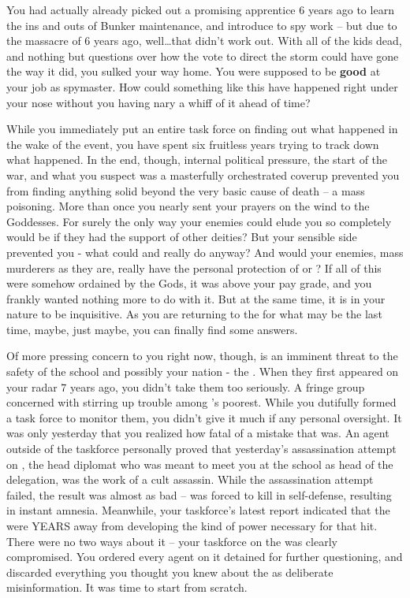 \documentclass[char]{GL2020}
\begin{document}
You had actually already picked out a promising apprentice 6 years ago to learn the ins and outs of Bunker maintenance, and introduce to spy work -- but due to the massacre of 6 years ago, well\ldots that didn’t work out. With all of the kids dead, and nothing but questions over how the vote to direct the storm could have gone the way it did, you sulked your way home. You were supposed to be \textbf{good} at your job as spymaster. How could something like this have happened right under your nose without you having nary a whiff of it ahead of time? 

While you immediately put an entire task force on finding out what happened in the wake of the event, you have spent six fruitless years trying to track down what happened. In the end, though, internal political pressure, the start of the war, and what you suspect was a masterfully orchestrated coverup prevented you from finding anything solid beyond the very basic cause of death -- a mass poisoning. More than once you nearly sent your prayers on the wind to the Goddesses. For surely the only way your enemies could elude you so completely would be if they had the support of other deities? But your sensible side prevented you - what could \cEbb{} and \cFlow{} really do anyway? And would your enemies, mass murderers as they are, really have the personal protection of \cTechGod{} or \cFarmGod{}? If all of this were somehow ordained by the Gods, it was above your pay grade, and you frankly wanted nothing more to do with it. But at the same time, it is in your nature to be inquisitive. As you are returning to the \pSchool{} for what may be the last time, maybe, just maybe, you can finally find some answers.

Of more pressing concern to you right now, though, is an imminent threat to the safety of the school and possibly your nation - the \pGoaties{}. When they first appeared on your radar 7 years ago, you didn’t take them too seriously. A fringe group concerned with stirring up trouble among \pEarth{}’s poorest. While you dutifully formed a task force to monitor them, you didn’t give it much if any personal oversight. It was only yesterday that you realized how fatal of a mistake that was. An agent outside of the taskforce personally proved that yesterday’s assassination attempt on \cHeadDiplomat{}, the head diplomat who was meant to meet you at the school as head of the \pShip{} delegation, was the work of a cult assassin. While the assassination attempt failed, the result was almost as bad -- \cHeadDiplomat{} was forced to kill in self-defense, resulting in instant amnesia. Meanwhile, your taskforce’s latest report indicated that the \pGoaties{} were YEARS away from developing the kind of power necessary for that hit. There were no two ways about it -- your taskforce on the \pGoaties{} was clearly compromised. You ordered every agent on it detained for further questioning, and discarded everything you thought you knew about the \pGoaties{} as deliberate misinformation. It was time to start from scratch.
\end{document}
